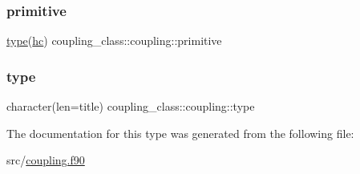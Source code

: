 \mbox{\label{structcoupling__class_1_1coupling_a330aec84b5697ea890627c9a10562fb5}} 
\subsubsection{\texorpdfstring{primitive}{primitive}}
{\footnotesize\ttfamily \hyperlink{structcoupling__class_1_1coupling_a74b13fd447f07c24380e3913fd06d545}{type}(\hyperlink{structhc__class_1_1hc}{hc}) coupling\+\_\+class\+::coupling\+::primitive\hspace{0.3cm}{\ttfamily [private]}}

\mbox{\label{structcoupling__class_1_1coupling_a74b13fd447f07c24380e3913fd06d545}} 
\subsubsection{\texorpdfstring{type}{type}}
{\footnotesize\ttfamily character(len=title) coupling\+\_\+class\+::coupling\+::type\hspace{0.3cm}{\ttfamily [private]}}



The documentation for this type was generated from the following file\+:\begin{DoxyCompactItemize}
\item 
src/\hyperlink{coupling_8f90}{coupling.\+f90}\end{DoxyCompactItemize}
